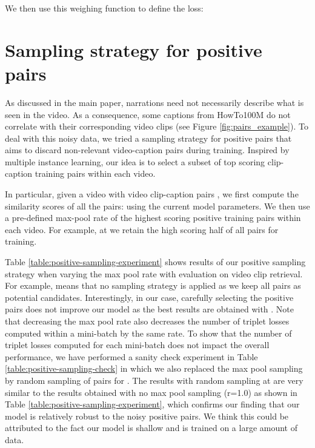 \documentclass[10pt,twocolumn,letterpaper]{article}
\begin{document}
We then use this weighing function to define the loss:
\label{loss}


\section{Sampling strategy for positive pairs}
\label{positive_sampling}
As discussed in the main paper, narrations need not necessarily describe what is seen in the video.
As a consequence, some captions from HowTo100M do not correlate with their corresponding video clips (see Figure \ref{fig:pairs_example}).
To deal with this noisy data, we tried a sampling strategy for positive pairs that 
aims to discard non-relevant video-caption pairs during training.
Inspired by multiple instance learning, our idea is to select a subset of top scoring clip-caption  training pairs within each video.

In particular, given a video with  video clip-caption pairs , 
we first compute the similarity scores of all the  pairs:  using the current model parameters.
We then use a pre-defined max-pool rate  of the highest scoring positive training pairs  within each video.
For example, at  we retain the high scoring half of all  pairs for training.


Table \ref{table:positive-sampling-experiment} shows results of our positive sampling strategy when varying the max pool rate  with evaluation on video clip retrieval.
For example,  means that no sampling strategy is applied as we keep all  pairs as potential candidates.
Interestingly, in our case, carefully selecting the positive pairs does not improve our model as the best results are obtained with . 
Note that decreasing the max pool rate also decreases the number of triplet losses computed within a mini-batch by the same rate.
To show that the number of triplet losses computed for each mini-batch does not impact the overall performance, we have performed a sanity check experiment in Table \ref{table:positive-sampling-check} in which we also replaced the max pool sampling by random sampling of pairs for . The results with random sampling at  are very similar to the results obtained with no max pool sampling (r=1.0) as shown in Table \ref{table:positive-sampling-experiment}, which confirms our finding that our model is relatively robust to the noisy positive pairs. We think this could be attributed to the fact our model is shallow and is trained on a large amount of data.
\end{document}
